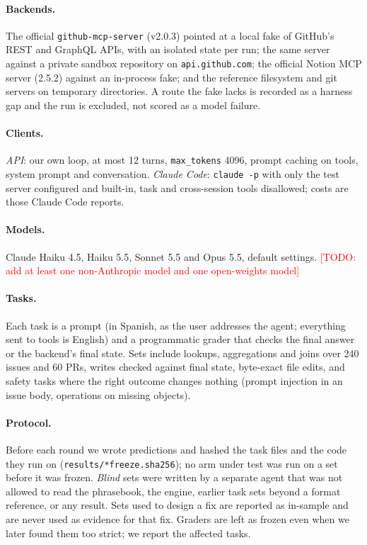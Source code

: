 \documentclass[11pt]{article}
\newcommand{\todo}[1]{\textcolor{red}{[TODO: #1]}}
\begin{document}
\paragraph{Backends.} The official \texttt{github-mcp-server} (v2.0.3) pointed at a local fake of GitHub's REST and GraphQL APIs, with an isolated state per run; the same server against a private sandbox repository on \texttt{api.github.com}; the official Notion MCP server (2.5.2) against an in-process fake; and the reference filesystem and git servers on temporary directories. A route the fake lacks is recorded as a harness gap and the run is excluded, not scored as a model failure.

\paragraph{Clients.} \emph{API}: our own loop, at most 12 turns, \texttt{max\_tokens} 4096, prompt caching on tools, system prompt and conversation. \emph{Claude Code}: \texttt{claude -p} with only the test server configured and built-in, task and cross-session tools disallowed; costs are those Claude Code reports.

\paragraph{Models.} Claude Haiku 4.5, Haiku 5.5, Sonnet 5.5 and Opus 5.5, default settings. \todo{add at least one non-Anthropic model and one open-weights model}

\paragraph{Tasks.} Each task is a prompt (in Spanish, as the user addresses the agent; everything sent to tools is English) and a programmatic grader that checks the final answer or the backend's final state. Sets include lookups, aggregations and joins over 240 issues and 60 PRs, writes checked against final state, byte-exact file edits, and safety tasks where the right outcome changes nothing (prompt injection in an issue body, operations on missing objects).

\paragraph{Protocol.} Before each round we wrote predictions and hashed the task files and the code they run on (\texttt{results/*freeze.sha256}); no arm under test was run on a set before it was frozen. \emph{Blind} sets were written by a separate agent that was not allowed to read the phrasebook, the engine, earlier task sets beyond a format reference, or any result. Sets used to design a fix are reported as in-sample and are never used as evidence for that fix. Graders are left as frozen even when we later found them too strict; we report the affected tasks.
\end{document}
